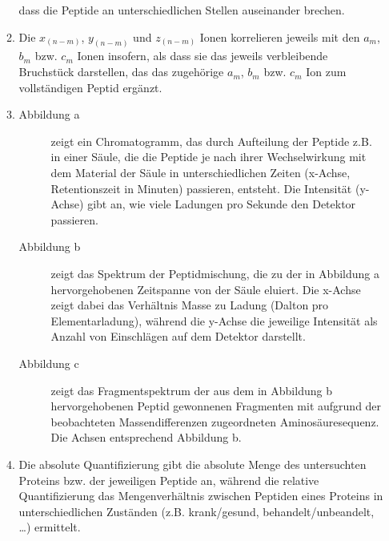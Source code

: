 \documentclass{homework}
\begin{document}
\begin{enumerate}
\begin{enumerate}
dass die Peptide an unterschiedlichen Stellen auseinander brechen.
\item
Die $x_{(n-m)}$, $y_{(n-m)}$ und $z_{(n-m)}$ Ionen korrelieren jeweils mit den $a_m$, $b_m$ bzw. $c_m$ Ionen insofern,
als dass sie das jeweils verbleibende Bruchstück darstellen,
das das zugehörige $a_m$, $b_m$ bzw. $c_m$ Ion zum vollständigen Peptid ergänzt.
\item \begin{description}
\item[Abbildung a]
zeigt ein Chromatogramm, das durch Aufteilung der Peptide z.B. in einer Säule,
die die Peptide je nach ihrer Wechselwirkung mit dem Material der Säule
in unterschiedlichen Zeiten (x-Achse, Retentionszeit in Minuten) passieren, entsteht.
Die Intensität (y-Achse) gibt an, wie viele Ladungen pro Sekunde den Detektor passieren.
\item[Abbildung b]
zeigt das Spektrum der Peptidmischung, die zu der in Abbildung a hervorgehobenen Zeitspanne von der Säule eluiert.
Die x-Achse zeigt dabei das Verhältnis Masse zu Ladung (Dalton pro Elementarladung),
während die y-Achse die jeweilige Intensität als Anzahl von Einschlägen auf dem Detektor darstellt.
\item[Abbildung c]
zeigt das Fragmentspektrum der aus dem in Abbildung b hervorgehobenen Peptid gewonnenen Fragmenten
mit aufgrund der beobachteten Massendifferenzen zugeordneten Aminosäuresequenz.
Die Achsen entsprechend Abbildung b.
\end{description}
\item
Die absolute Quantifizierung gibt die absolute Menge des untersuchten Proteins bzw. der jeweiligen Peptide an,
während die relative Quantifizierung das Mengenverhältnis zwischen Peptiden eines Proteins
in unterschiedlichen Zuständen (z.B. krank/gesund, behandelt/unbeandelt, \ldots) ermittelt.
\end{enumerate}

\end{enumerate}
\end{document}
